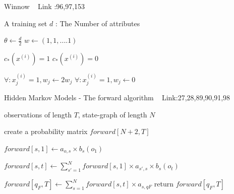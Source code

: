 \documentclass[a4paper]{article}
\begin{document}
      
      \begin{algorithm}
   \caption{Winnow ~\cite{winnowalgo1
   } Link :96,97,153
    }
   
   
   
  \begin{algorithmic}[1]
   \INPUT 
   \Statex A training set
   \Statex $d$ : The Number of attributes
   
  
  \State $\theta \leftarrow \frac{d}{2}$
  \State $w \leftarrow (1,1,....1)$
  
  
   \State $c_{*}(x^{(i)}) = 1$
   \Else
    \State $c_{*}(x^{(i)}) = 0$
  \EndIf
  
  \State $\forall : x_{j}^{(i)} = 1 , w_{j} \leftarrow 2w_{j} $
   \Else
    \State $\forall : x_{j}^{(i)} = 1 , w_{j} \leftarrow 0 $
  
   
   
  \EndIf
  
  
  
  \EndFor
  

    
   
    \end{algorithmic}
\end{algorithm} 

\begin{algorithm}
   \caption{Hidden Markov Models - The forward algorithm ~\cite{ jurafsky_martin_2008} Link:27,28,89,90,91,98 }
 \begin{algorithmic}[1]
  \INPUT 
   \Statex  observations of length $T$, state-graph of length $N$
   
    
    \State create a probability matrix $forward[N+2,T]$
    
   \State $forward[s,1] \leftarrow a_{o,s} \times b_{s}(o_{1})$
   
   \EndFor
   
   \State $forward[s,t] \leftarrow  \sum_{s'=1}^N forward[s,1] \times a_{s',s} \times b_{s} (o_{t}) $
   
   \EndFor
   
   \EndFor
   
  \State $forward[q_{F},T]  \leftarrow \sum_{s=1}^N forward[s,t] \times a_{s,qF}   $
  \State  return $forward[q_{F},T]$
    \end{algorithmic}

\end{algorithm}
\end{document}
